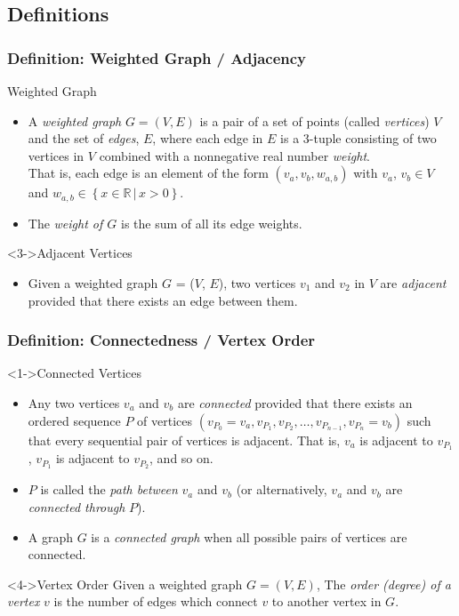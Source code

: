 \documentclass{beamer}
\begin{document}
\subsection{Definitions}
\begin{frame}
\frametitle{Definition: Weighted Graph / Adjacency}
\begin{block}{Weighted Graph}
\begin{itemize}
\item<1-> {
A \emph{weighted graph} \(G = (V, E)\) is a pair of a set of 
points (called \emph{vertices}) \(V\) and the set of \emph{edges}, \(E\), where each edge in \(E\) is a 3-tuple consisting of two 
vertices in \(V\) combined with a nonnegative real number \emph{weight}. \\ That is, each edge is an element of the form \((v_a, v_b, 
w_{a,b})\) with \(v_a\), \(v_b \in V\) and \(w_{a,b} \in \left\{x \in \mathbb{R} \,\vert\, x > 0\right\}\).
}
\item<2-> {
The \emph{weight of \(G\)} is the sum of all its edge weights.
} 
\end{itemize}
\end{block}
\begin{block}<3->{Adjacent Vertices}
\begin{itemize}
\item<3-> {
Given a weighted graph \(G\) = (\(V\), \(E\)), two vertices \(v_1\) and \(v_2\) in \(V\) are \emph{adjacent} provided that there exists an edge between them. 
}
\end{itemize}
\end{block}
\end{frame}

\begin{frame}
\frametitle{Definition: Connectedness / Vertex Order}
\begin{block}<1->{Connected Vertices}
\footnotesize\begin{itemize}
\item<1-> {
Any two vertices \(v_a\) and \(v_b\) are \emph{connected} provided that there exists an ordered sequence \(P\) of 
vertices \((v_{P_0} = v_a , v_{P_1}, v_{P_2}, \ldots, v_{P_{n-1}}, v_{P_n} = v_b)\) such that every sequential pair of vertices is 
adjacent. That is, \(v_a\) is adjacent to \(v_{P_1}\), \(v_{P_1}\) is adjacent to \(v_{P_2}\), and so on. 
}
\item<2-> {
\(P\) is called the 
\emph{path between} \(v_a\) and \(v_b\) (or alternatively, \(v_a\) and \(v_b\) are \emph{connected through} \(P\)).
}
\item<3-> {
A graph \(G\) is a \emph{connected graph} when all possible pairs of vertices are connected.
}
\end{itemize}
\end{block}
\begin{block}<4->{Vertex Order}
\small{ Given a weighted graph \(G = (V, E)\), The \emph{order (degree) of a vertex} \(v\) is the number of edges which connect \(v\) to another vertex in \(G\). }
\end{block}
\end{frame}
\end{document}
